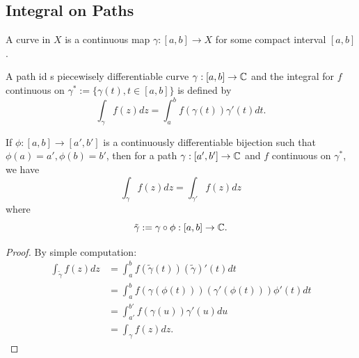 \subsection{Integral on Paths}

\begin{definition}
     A curve in $X$ is a continuous map $\gamma:[a,b] \to X$ for some compact interval $[a,b]$.\par
    A path id s piecewisely differentiable curve $\gamma:[a,b] \to \mathbb{C}$ and the integral for $f$ continuous on $\gamma^*:= \{\gamma(t), t\in [a,b]\}$ is defined by
    \[
    \int_{\gamma}f(z)dz = \int_a^b f(\gamma(t))\gamma'(t)dt.
    \]
\end{definition}

\begin{lemma}
    If $\phi:[a,b] \to [a',b']$ is a continuously differentiable bijection such that $\phi(a) = a', \phi(b) = b'$, then for a path $\gamma:[a',b'] \to \mathbb{C}$ and $f$ continuous on $\gamma^*$, we have
    \[
    \int_{\gamma} f(z)dz = \int_{\gamma'}f(z)dz
    \]
    where
    \[\tilde{\gamma} := \gamma\circ \phi:[a,b] \to \mathbb{C}.\]
\end{lemma}
\begin{proof}
    By simple computation:
    \[
    \begin{aligned}
        \int_{\tilde{\gamma}}f(z)dz &= \int_a^b f(\tilde{\gamma}(t))(\tilde{\gamma})'(t)dt \\
        &= \int_a^b f(\gamma(\phi(t)))(\gamma'(\phi(t)))\phi'(t)dt \\
        &= \int_{a'}^{b'}f(\gamma(u))\gamma'(u)du \\
        &= \int_{\gamma}f(z)dz.
    \end{aligned}
    \]
\end{proof}

